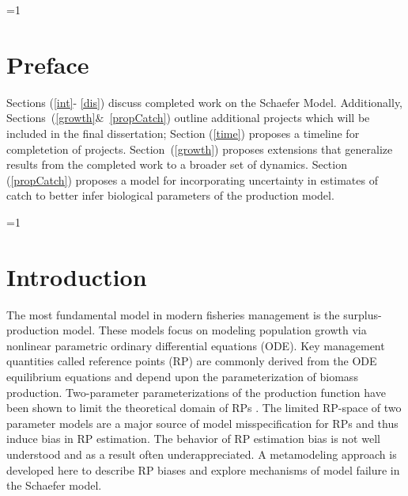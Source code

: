 \documentclass[12pt]{article}
\newcounter{alphasect}
\def\alphainsection{0}
\let\oldsection=\section
\def\section{%
  \ifnum\alphainsection=1%
    \addtocounter{alphasect}{1}
  \fi%
\oldsection}%
\begin{document}
%
\vspace*{0.5cm}
\section*{Preface}
Sections (\ref{int}- \ref{dis}\hspace*{-0.1cm}) discuss completed work on the Schaefer Model.
Additionally, \\\mbox{Sections (\ref{growth}$\&$ \ref{propCatch}\hspace*{-0.1cm})} outline additional 
projects which will be included in the final dissertation; Section (\ref{time}\hspace*{-0.1cm}) proposes a 
timeline for completetion of projects. \mbox{Section (\ref{growth}\hspace*{-0.1cm}})
\mbox{proposes} extensions that generalize results from the completed work
to a broader set of dynamics. %
Section (\ref{propCatch}\hspace*{-0.1cm}) proposes a model for incorporating uncertainty in 
estimates of catch to better infer biological parameters of the production model.  



%
\clearpage
\section{Introduction\label{int}}

%
The most fundamental model in modern fisheries management is the surplus-production 
model. These models focus on modeling population growth via nonlinear 
parametric ordinary differential equations (ODE). Key management quantities 
called reference points (RP) are commonly derived from the ODE equilibrium 
equations and depend upon the parameterization of biomass production. 
Two-parameter parameterizations of the production function have been shown to 
limit the theoretical domain of RPs . The 
limited RP-space of two parameter models are a major source of model 
misspecification for RPs and thus induce bias in RP estimation. The behavior 
of RP estimation bias is not well understood and as a result often 
underappreciated. A metamodeling approach is developed here to describe RP 
biases and explore mechanisms of model failure in the Schaefer model. 
\end{document}
